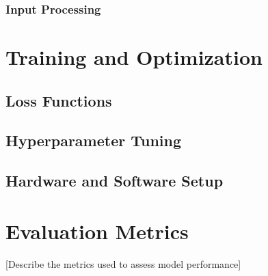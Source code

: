 \subsubsection{Input Processing}

\section{Training and Optimization}
\subsection{Loss Functions}
\subsection{Hyperparameter Tuning}
\subsection{Hardware and Software Setup}

\section{Evaluation Metrics}
[Describe the metrics used to assess model performance]
